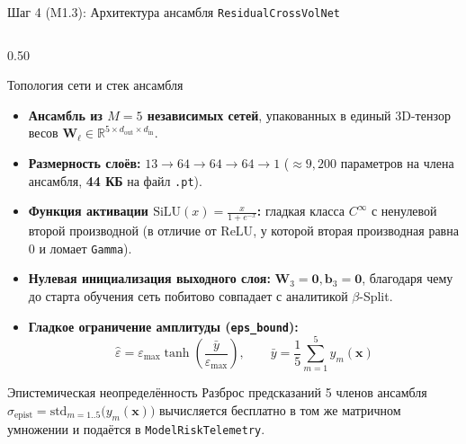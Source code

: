 \documentclass[aspectratio=169, 9pt]{beamer}
\begin{document}
\begin{frame}{Шаг 4 (M1.3): Архитектура ансамбля \texttt{ResidualCrossVolNet}}
\begin{columns}[T]
    \begin{column}{0.50\textwidth}
      \begin{block}{Топология сети и стек ансамбля}
        \begin{itemize}
          \item \textbf{Ансамбль из $M = 5$ независимых сетей}, упакованных в единый 3D-тензор весов $\bm{W}_\ell \in \mathbb{R}^{5 \times d_{\text{out}} \times d_{\text{in}}}$.
          \item \textbf{Размерность слоёв:} $13 \to 64 \to 64 \to 64 \to 1$ ($\approx 9,200$ параметров на члена ансамбля, \textbf{44 КБ} на файл \texttt{.pt}).
          \item \textbf{Функция активации $\text{SiLU}(x) = \frac{x}{1 + e^{-x}}$:} гладкая класса $C^\infty$ с ненулевой второй производной (в отличие от $\text{ReLU}$, у которой вторая производная равна 0 и ломает \texttt{Gamma}).
          \item \textbf{Нулевая инициализация выходного слоя:} $\bm{W}_3 = \bm{0}, \bm{b}_3 = \bm{0}$, благодаря чему до старта обучения сеть побитово совпадает с аналитикой $\beta$-Split.
          \item \textbf{Гладкое ограничение амплитуды (\texttt{eps\_bound}):}
            $$\hat{\varepsilon} = \varepsilon_{\max}\tanh\!\left(\frac{\bar{y}}{\varepsilon_{\max}}\right), \qquad \bar{y} = \frac{1}{5}\sum_{m=1}^{5} y_m(\bm{x})$$
        \end{itemize}
      \end{block}

      \begin{exampleblock}{Эпистемическая неопределённость}
        Разброс предсказаний 5 членов ансамбля $\sigma_{\text{epist}} = \text{std}_{m=1..5}\big(y_m(\bm{x})\big)$ вычисляется бесплатно в том же матричном умножении и подаётся в \texttt{ModelRiskTelemetry}.
      \end{exampleblock}
    \end{column}
  \end{columns}
\end{frame}
\end{document}
